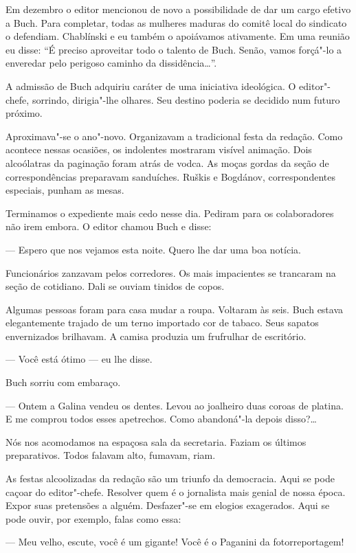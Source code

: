 Em dezembro o editor mencionou de novo a possibilidade de dar um cargo
efetivo a Buch. Para completar, todas as mulheres maduras do comitê
local do sindicato o defendiam. Chablínski e eu também o apoiávamos ativamente. Em
uma reunião eu disse: ``É preciso aproveitar todo o talento de Buch.
Senão, vamos forçá"-lo a enveredar pelo perigoso caminho da
dissidência\ldots{}''.

A admissão de Buch adquiriu caráter de uma iniciativa ideológica. O
editor"-chefe, sorrindo, dirigia"-lhe olhares. Seu destino poderia se
decidido num futuro próximo.

Aproximava"-se o ano"-novo. Organizavam a tradicional festa da redação.
Como acontece nessas ocasiões, os indolentes mostraram visível animação.
Dois alcoólatras da paginação foram atrás de vodca. As moças gordas da
seção de correspondências preparavam sanduíches. Ruškis e Bogdánov,
correspondentes especiais, punham as mesas.

Terminamos o expediente mais cedo nesse dia. Pediram para os
colaboradores não irem embora. O editor chamou Buch e disse:

--- Espero que nos vejamos esta noite. Quero lhe dar uma boa notícia.

Funcionários zanzavam pelos corredores. Os mais impacientes se trancaram
na seção de cotidiano. Dali se ouviam tinidos de copos.

Algumas pessoas foram para casa mudar a roupa. Voltaram às seis. Buch
estava elegantemente trajado de um terno importado cor de tabaco. Seus
sapatos envernizados brilhavam. A camisa produzia um frufrulhar de
escritório.

--- Você está ótimo --- eu lhe disse.

Buch sorriu com embaraço.

--- Ontem a Galina vendeu os dentes. Levou ao joalheiro duas coroas de
platina. E me comprou todos esses apetrechos. Como abandoná"-la depois
disso?\ldots{}

Nós nos acomodamos na espaçosa sala da secretaria. Faziam os últimos
preparativos. Todos falavam alto, fumavam, riam.

As festas alcoolizadas da redação são um triunfo da democracia. Aqui se
pode caçoar do editor"-chefe. Resolver quem é o jornalista mais genial de
nossa época. Expor suas pretensões a alguém. Desfazer"-se em elogios
exagerados. Aqui se pode ouvir, por exemplo, falas como essa:

--- Meu velho, escute, você é um gigante! Você é o Paganini da
fotorreportagem!

